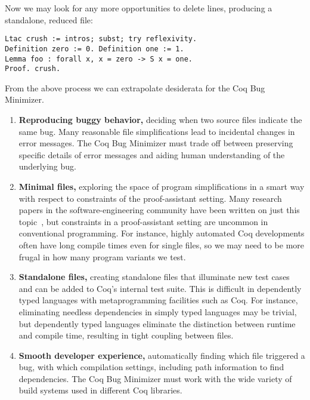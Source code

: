 \documentclass[a4paper,USenglish,cleveref,autoref,thm-restate,pdfa]{lipics-v2021}
\begin{document}
Now we may look for any more opportunities to delete lines, producing a standalone, reduced file:
\begin{verbatim}
Ltac crush := intros; subst; try reflexivity.
Definition zero := 0. Definition one := 1.
Lemma foo : forall x, x = zero -> S x = one.
Proof. crush.
\end{verbatim}

From the above process we can extrapolate desiderata for the Coq Bug Minimizer.

\begin{enumerate}
\item \textbf{Reproducing buggy behavior,} deciding when two source files indicate the same bug.
Many reasonable file simplifications lead to incidental changes in error messages.
The Coq Bug Minimizer must trade off between preserving specific details of error messages and aiding human understanding of the underlying bug.

\item \textbf{Minimal files,} exploring the space of program simplifications in a smart way with respect to constraints of the proof-assistant setting.
Many research papers in the software-engineering community have been written on just this topic~\cite{Cleve2000,zeller2009programs,Burger2005,delta,Zeller2002}, but constraints in a proof-assistant setting are uncommon in conventional programming.
For instance, highly automated Coq developments often have long compile times even for single files, so we may need to be more frugal in how many program variants we test.

\item \textbf{Standalone files,} creating standalone files that illuminate new test cases and can be added to Coq's internal test suite.
This is difficult in dependently typed languages with metaprogramming facilities such as Coq.
For instance, eliminating needless dependencies in simply typed languages may be trivial, but dependently typed languages eliminate the distinction between runtime and compile time, resulting in tight coupling between files.

\item \textbf{Smooth developer experience,} automatically finding which file triggered a bug, with which compilation settings, including path information to find dependencies.
The Coq Bug Minimizer must work with the wide variety of build systems used in different Coq libraries.


\end{enumerate}
\end{document}
